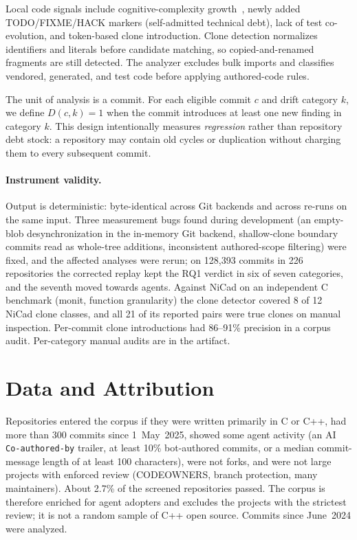 \documentclass[sigplan,11pt,nonacm=true]{acmart}
\begin{document}
Local code signals include cognitive-complexity
growth~\cite{campbell2018}, newly added TODO/\allowbreak FIXME/\allowbreak HACK markers
(self-admitted technical debt), lack of test co-evolution, and token-based
clone introduction. Clone detection normalizes identifiers and literals before
candidate matching, so copied-and-renamed fragments are still detected. The
analyzer excludes bulk imports and classifies vendored, generated, and test
code before applying authored-code rules.

The unit of analysis is a commit. For each eligible commit $c$ and drift
category $k$, we define $D(c,k)=1$ when the commit introduces at least one new
finding in category $k$. This design intentionally measures \emph{regression}
rather than repository debt stock: a repository may contain old cycles or
duplication without charging them to every subsequent commit.

\paragraph{Instrument validity.} Output is deterministic: byte-identical
across Git backends and across re-runs on the same input. Three measurement
bugs found during development (an empty-blob desynchronization in the
in-memory Git backend, shallow-clone boundary commits read as whole-tree
additions, inconsistent authored-scope filtering) were fixed, and the affected
analyses were rerun; on 128{,}393 commits in 226 repositories the corrected
replay kept the RQ1 verdict in six of seven categories, and the seventh moved
towards agents. Against NiCad on an independent C benchmark (monit, function
granularity) the clone detector covered 8 of 12 NiCad clone classes, and all
21 of its reported pairs were true clones on manual inspection. Per-commit
clone introductions had 86--91\% precision in a corpus audit. Per-category
manual audits are in the artifact.

\section{Data and Attribution}
\label{sec:data-attribution}

Repositories entered the corpus if they were written primarily in C or C++,
had more than 300 commits since 1~May~2025, showed some agent activity (an AI
\texttt{Co-authored-by} trailer, at least 10\% bot-authored commits, or a
median commit-message length of at least 100 characters), were not forks, and
were not large projects with enforced review (CODEOWNERS, branch protection,
many maintainers). About 2.7\% of the screened repositories passed. The corpus
is therefore enriched for agent adopters and excludes the projects with the
strictest review; it is not a random sample of C++ open source. Commits since
June~2024 were analyzed.
\end{document}
